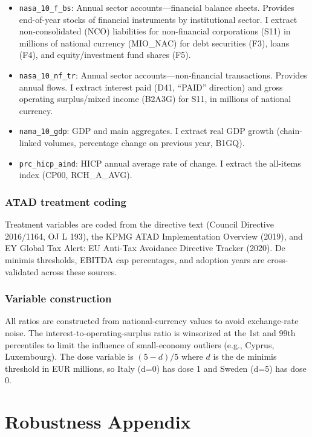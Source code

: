 \documentclass[12pt]{article}
\begin{document}
\begin{itemize}
\item \texttt{nasa\_10\_f\_bs}: Annual sector accounts---financial balance sheets. Provides end-of-year stocks of financial instruments by institutional sector. I extract non-consolidated (NCO) liabilities for non-financial corporations (S11) in millions of national currency (MIO\_NAC) for debt securities (F3), loans (F4), and equity/investment fund shares (F5).

\item \texttt{nasa\_10\_nf\_tr}: Annual sector accounts---non-financial transactions. Provides annual flows. I extract interest paid (D41, ``PAID'' direction) and gross operating surplus/mixed income (B2A3G) for S11, in millions of national currency.

\item \texttt{nama\_10\_gdp}: GDP and main aggregates. I extract real GDP growth (chain-linked volumes, percentage change on previous year, B1GQ).

\item \texttt{prc\_hicp\_aind}: HICP annual average rate of change. I extract the all-items index (CP00, RCH\_A\_AVG).
\end{itemize}

\subsubsection*{ATAD treatment coding} Treatment variables are coded from the directive text (Council Directive 2016/1164, OJ L 193), the KPMG ATAD Implementation Overview (2019), and EY Global Tax Alert: EU Anti-Tax Avoidance Directive Tracker (2020). De minimis thresholds, EBITDA cap percentages, and adoption years are cross-validated across these sources.

\subsubsection*{Variable construction} All ratios are constructed from national-currency values to avoid exchange-rate noise. The interest-to-operating-surplus ratio is winsorized at the 1st and 99th percentiles to limit the influence of small-economy outliers (e.g., Cyprus, Luxembourg). The dose variable is $(5 - d)/5$ where $d$ is the de minimis threshold in EUR millions, so Italy (d=0) has dose 1 and Sweden (d=5) has dose 0.

\section{Robustness Appendix}
\end{document}
